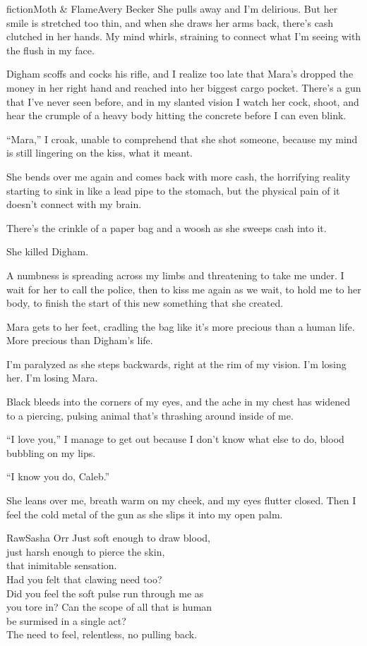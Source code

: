 \begin{prose}{fiction}{Moth \& Flame}{Avery Becker}
She pulls away and I'm delirious. But her smile is stretched too thin, and when she draws her arms back, there's cash clutched in her hands. My mind whirls, straining to connect what I'm seeing with the flush in my face.\par
Digham scoffs and cocks his rifle, and I realize too late that Mara's dropped the money in her right hand and reached into her biggest cargo pocket. There's a gun that I've never seen before, and in my slanted vision I watch her cock, shoot, and hear the crumple of a heavy body hitting the concrete before I can even blink. \par
“Mara,” I croak, unable to comprehend that she shot someone, because my mind is still lingering on the kiss, what it meant.\par
She bends over me again and comes back with more cash, the horrifying reality starting to sink in like a lead pipe to the stomach, but the physical pain of it doesn't connect with my brain. \par
There's the crinkle of a paper bag and a woosh as she sweeps cash into it. \par
She killed Digham.\par
A numbness is spreading across my limbs and threatening to take me under. I wait for her to call the police, then to kiss me again as we wait, to hold me to her body, to finish the start of this new something that she created.\par
Mara gets to her feet, cradling the bag like it's more precious than a human life. More precious than Digham's life.\par
I'm paralyzed as she steps backwards, right at the rim of my vision. I'm losing her. I'm losing Mara. \par
Black bleeds into the corners of my eyes, and the ache in my chest has widened to a piercing, pulsing animal that's thrashing around inside of me. \par
“I love you,” I manage to get out because I don't know what else to do, blood bubbling on my lips.\par
“I know you do, Caleb.” \par
She leans over me, breath warm on my cheek, and my eyes flutter closed. Then I feel the cold metal of the gun as she slips it into my open palm.
\end{prose}


\begin{poetry}{Raw}{Sasha Orr}
Just soft enough to draw blood,\\
just harsh enough to pierce the skin,\\
that inimitable sensation.\\
Had you felt that clawing need too?\\
Did you feel the soft pulse run through me as\\
you tore in? Can the scope of all that is human\\
be surmised in a single act?\\
The need to feel, relentless, no pulling back.
\end{poetry}

